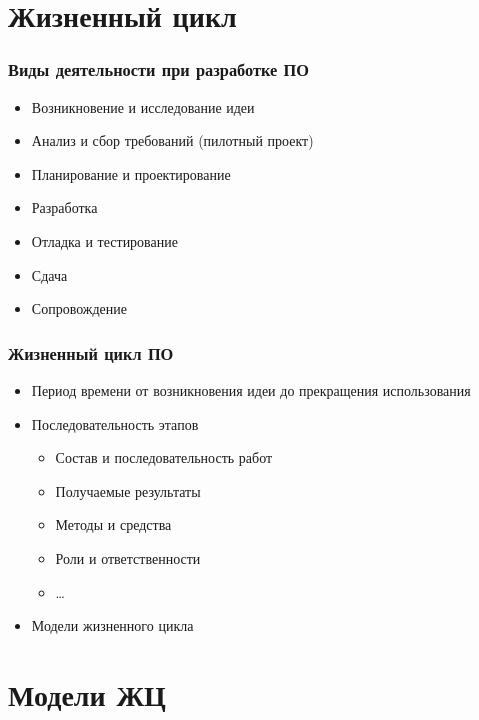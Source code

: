 \documentclass{../../slides-style}
\begin{document}
    \begin{frame}[plain]
        \titlepage
    \end{frame}

    \section{Жизненный цикл}

    \begin{frame}
        \frametitle{Виды деятельности при разработке ПО}
        \begin{itemize}
            \item Возникновение и исследование идеи
            \item Анализ и сбор требований (пилотный проект)
            \item Планирование и проектирование
            \item Разработка
            \item Отладка и тестирование
            \item Сдача
            \item Сопровождение
        \end{itemize}
    \end{frame}

    \begin{frame}
        \frametitle{Жизненный цикл ПО}
        \begin{itemize}
            \item Период времени от возникновения идеи до прекращения использования
            \item Последовательность этапов
            \begin{itemize}
                \item Состав и последовательность работ
                \item Получаемые результаты
                \item Методы и средства
                \item Роли и ответственности
                \item \dots
            \end{itemize}
            \item Модели жизненного цикла
        \end{itemize}
    \end{frame}

    \section{Модели ЖЦ}
\end{document}
